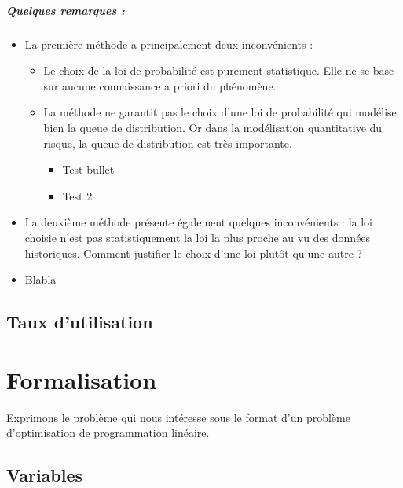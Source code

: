\documentclass[12pt,a4paper]{report}
\begin{document}
\paragraph{Quelques remarques :}
\begin{itemize}
    \item La première méthode a principalement deux inconvénients :
    \begin{itemize}
        \item Le choix de la loi de probabilité est purement statistique. Elle ne se base sur aucune connaissance a priori du phénomène.
        \item La méthode ne garantit pas le choix d’une loi de probabilité qui modélise bien la queue de distribution. Or dans la modélisation quantitative du risque, la queue de distribution est très importante.
        \begin{itemize}
            \item Test bullet
            \item Test 2
        \end{itemize}
    \end{itemize}
    \item La deuxième méthode présente également quelques inconvénients : la loi choisie n’est pas statistiquement la loi la plus proche au vu des données historiques. Comment justifier le choix d’une loi plutôt qu’une autre ?
    \item Blabla
\end{itemize}

\section{Taux d'utilisation}

\newpage

\chapter{Formalisation}
Exprimons le problème qui nous intéresse sous le format d'un problème d'optimisation de programmation linéaire.

\section{Variables}
\end{document}

